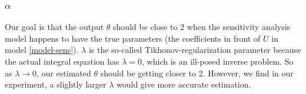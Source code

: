 \documentclass[11pt]{article}
\begin{document}
\subsubsection{$\alpha$}

Our goal is that the output $\theta$ should be close to 2 when the sensitivity analysis model happens to have the true parameters (the coefficients in front of $U$ in model \eqref{model-sens}). $\lambda$ is the so-called Tikhonov-regularization parameter because the actual integral equation has $\lambda = 0$, which is an ill-posed inverse problem. So as $\lambda \rightarrow 0$, our estimated $\theta$ should be getting closer to 2. However, we find in our experiment, a slightly larger $\lambda$ would give more accurate estimation.



\end{document}
